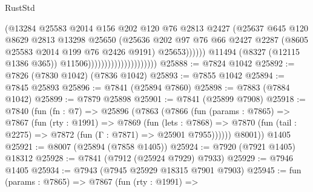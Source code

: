 \begin{lexlean}{RustStd}
\begin{coremodule}
{\begin{coremodule}
{{{{{{{{{{{{{{{{{{{{{{{{{{{{{{{{{{{{{{{{{{{{{{{{{{{{{{                                                    (@13284
                                                      @25583
                                                      @2014
                                                      @156
                                                      @202
                                                      @120
                                                      @76
                                                      @2813
                                                      @2427
                                                      (@25637
                                                        @645
                                                        @120
                                                        @8629
                                                        @2813
                                                        @13298
                                                        @25650
                                                        (@25636
                                                          @202
                                                          @97
                                                          @76
                                                          @66
                                                          @2427
                                                          @2287
                                                          (@8605 @25583 @2014 @199 @76 @2426 @9191)
                                                          @25653))))))
                                              @11494
                                              (@8327 (@12115 @1386 @365))
                                              @11506)))))))))))))))))))))
@25888 := @7824 @1042
@25892 := @7826 (@7830 @1042) (@7836 @1042)
@25893 := @7855 @1042
@25894 := @7845 @25893
@25896 := @7841 (@25894 @7860)
@25898 := @7883 (@7884 @1042)
@25899 := @7879 @25898
@25901 := @7841 (@25899 @7908)
@25918 := @7840
    (fun (fn : @7) =>
    @25896
      (@7863
        (@7866
          (fun (params : @7865) =>
          @7867
            (fun (rty : @1991) =>
            @7869
              (fun (lets : @7868) =>
              @7870 (fun (tail : @2275) => @7872 (fun (Γ : @7871) => @25901 @7955))))))
        @8001))
    @1405
@25921 := @8007 (@25894 (@7858 @1405))
@25924 := @7920 (@7921 @1405) @18312
@25928 := @7841 (@7912 (@25924 @7929) @7933)
@25929 := @7946 @1405
@25934 := @7943 (@7945 @25929 @18315 @7901 @7903)
@25945 := fun (params : @7865) =>
  @7867
    (fun (rty : @1991) =>
}}}}}}}}}}}}}}}}}}}}}}}}}}}}}}}}}}}}}}}}}}}}}}}}}}}}}}
\end{coremodule}}
\end{coremodule}
\end{lexlean}
